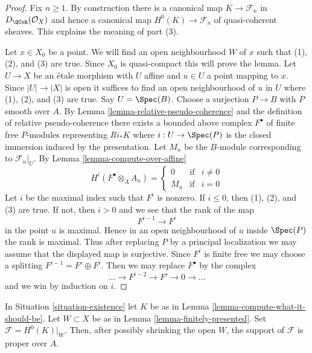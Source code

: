 \begin{proof}
Fix $n \geq 1$. By construction there is a canonical map
$K \to \mathcal{F}_n$ in $D_\QCoh(\mathcal{O}_X)$
and hence a canonical map $H^0(K) \to \mathcal{F}_n$
of quasi-coherent sheaves. This explains the meaning of part (3).

\medskip\noindent
Let $x \in X_0$ be a point. We will find an open neighbourhood $W$
of $x$ such that (1), (2), and (3) are true. Since $X_0$ is quasi-compact
this will prove the lemma. Let $U \to X$ be an \'etale morphism
with $U$ affine and $u \in U$ a point mapping to $x$. Since $|U| \to |X|$
is open it suffices to find an open neighbourhood of $u$ in $U$
where (1), (2), and (3) are true. Say $U = \Spec(B)$.
Choose a surjection $P \to B$ with $P$ smooth over $A$.
By Lemma \ref{lemma-relative-pseudo-coherence}
and the definition of relative pseudo-coherence
there exists a bounded above complex $F^\bullet$
of finite free $P$-modules representing
$Ri_*K$ where $i : U \to \Spec(P)$ is the closed
immersion induced by the presentation.
Let $M_n$ be the $B$-module corresponding to $\mathcal{F}_n|_U$.
By Lemma \ref{lemma-compute-over-affine}
$$
H^i(F^\bullet \otimes_A A_n) =
\left\{
\begin{matrix}
0 & \text{if} & i \not = 0 \\
M_n & \text{if} & i = 0
\end{matrix}
\right.
$$
Let $i$ be the maximal index such that $F^i$ is nonzero.
If $i \leq 0$, then (1), (2), and (3) are true.
If not, then $i > 0$ and we see that the rank of the map
$$
F^{i - 1} \to F^i
$$
in the point $u$ is maximal. Hence in an open neighbourhood
of $u$ inside $\Spec(P)$ the rank is maximal. Thus after replacing
$P$ by a principal localization we may assume that the displayed
map is surjective. Since $F^i$ is finite free we may choose
a splitting $F^{i - 1} = F' \oplus F^i$. Then we may
replace $F^\bullet$ by the complex
$$
\ldots \to F^{i - 2} \to F' \to 0 \to \ldots
$$
and we win by induction on $i$.
\end{proof}

\begin{lemma}
\label{lemma-proper-support}
In Situation \ref{situation-existence} let $K$ be as in
Lemma \ref{lemma-compute-what-it-should-be}. Let $W \subset X$
be as in Lemma \ref{lemma-finitely-presented}.
Set $\mathcal{F} = H^0(K)|_W$. Then, after possibly shrinking the open $W$,
the support of $\mathcal{F}$ is proper over $A$.
\end{lemma}

